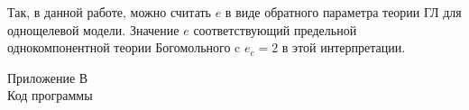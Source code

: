 Так, в данной работе, можно считать \( e \) в виде обратного параметра теории 
ГЛ для однощелевой модели. Значение \( e \) соответствующий предельной 
однокомпонентной теории Богомольного c \( e_c = 2 \) в этой интерпретации.

\newpage

\label{ch:C}
\begin{center}
    Приложение В\\
    Код программы
\end{center}
